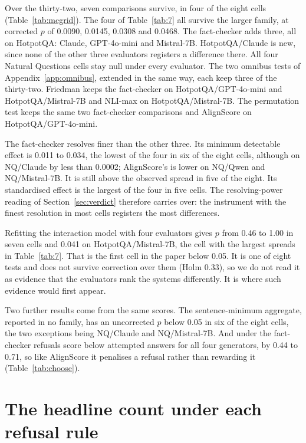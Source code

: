 \documentclass[11pt]{article}
\begin{document}
Over the thirty-two, seven comparisons survive, in four of the eight cells (Table~\ref{tab:mcgrid}). The four of Table~\ref{tab:7} all survive the larger family, at corrected $p$ of 0.0090, 0.0145, 0.0308 and 0.0468. The fact-checker adds three, all on HotpotQA: Claude, GPT-4o-mini and Mistral-7B. HotpotQA/Claude is new, since none of the other three evaluators registers a difference there. All four Natural Questions cells stay null under every evaluator. The two omnibus tests of Appendix~\ref{app:omnibus}, extended in the same way, each keep three of the thirty-two. Friedman keeps the fact-checker on HotpotQA/GPT-4o-mini and HotpotQA/Mistral-7B and NLI-max on HotpotQA/Mistral-7B. The permutation test keeps the same two fact-checker comparisons and AlignScore on HotpotQA/GPT-4o-mini.

The fact-checker resolves finer than the other three. Its minimum detectable effect is 0.011 to 0.034, the lowest of the four in six of the eight cells, although on NQ/Claude by less than 0.0002; AlignScore's is lower on NQ/Qwen and NQ/Mistral-7B. It is still above the observed spread in five of the eight. Its standardised effect is the largest of the four in five cells. The resolving-power reading of Section~\ref{sec:verdict} therefore carries over: the instrument with the finest resolution in most cells registers the most differences.

Refitting the interaction model with four evaluators gives $p$ from 0.46 to 1.00 in seven cells and 0.041 on HotpotQA/Mistral-7B, the cell with the largest spreads in Table~\ref{tab:7}. That is the first cell in the paper below 0.05. It is one of eight tests and does not survive correction over them (Holm 0.33), so we do not read it as evidence that the evaluators rank the systems differently. It is where such evidence would first appear.

Two further results come from the same scores. The sentence-minimum aggregate, reported in no family, has an uncorrected $p$ below 0.05 in six of the eight cells, the two exceptions being NQ/Claude and NQ/Mistral-7B. And under the fact-checker refusals score below attempted answers for all four generators, by 0.44 to 0.71, so like AlignScore it penalises a refusal rather than rewarding it (Table~\ref{tab:choose}).


\ifnum{}
\section{The headline count under each refusal rule}
\label{app:refusalrule}
\end{document}
